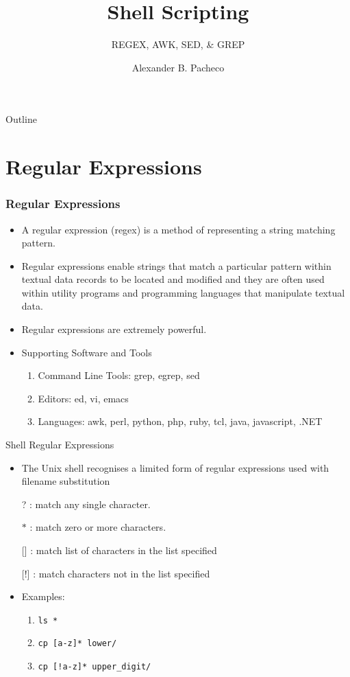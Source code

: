 \documentclass[10pt,t]{beamer}
\title{Shell Scripting}
\subtitle{REGEX, AWK, SED, \& GREP}
\author{Alexander B. Pacheco}
\institute{\href{http://researchcomputing.lehigh.edu}{LTS Research Computing}}%
\date{}
\begin{document}
\begin{frame}
  \titlepage
\end{frame}

\footnotesize
\begin{frame}{Outline}
  \tableofcontents
\end{frame}

\section{Regular Expressions}
\begin{frame}[c]
  \frametitle{Regular Expressions}
  \begin{itemize}
    \item A regular expression (regex) is a method of representing a string matching pattern. 
    \item Regular expressions enable strings that match a particular pattern within textual data records to be located and modified and they are often used within utility programs and programming languages that manipulate textual data. 
    \item Regular expressions are extremely powerful.
    \item Supporting Software and Tools
    \begin{enumerate}
        \item Command Line Tools: grep, egrep, sed
        \item Editors: ed, vi, emacs
        \item Languages: awk, perl, python, php, ruby, tcl, java, javascript, .NET
    \end{enumerate}
  \end{itemize}
\end{frame}

\begin{frame}[c]{Shell Regular Expressions}
  \begin{itemize}
    \item The Unix shell recognises a limited form of regular expressions used with filename substitution
    \item[?]: match any single character.
    \item[$\ast$]: match zero or more characters.
    \item[{[\quad]}]: match list of characters in the list specified
    \item[{[!\quad]}]: match characters not in the list specified
    \item Examples:
    \begin{enumerate}
      \item \texttt{ls *}
      \item \texttt{cp [a-z]* lower/}
      \item \texttt{cp [!a-z]* upper\_digit/}
    \end{enumerate}
  \end{itemize}
\end{frame}
\end{document}
